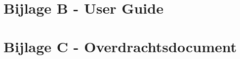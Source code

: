 \documentclass[a4paper]{report}
\begin{document}
\section{Bijlage B - User Guide}
\label{bijlage:userguide}
\begin{minipage}{\textwidth}
  \centering
\end{minipage}


\section{Bijlage C - Overdrachtsdocument}
\label{bijlage:overdrachtdocument}
\begin{minipage}{\textwidth}
  \centering
\end{minipage}

\end{document}

